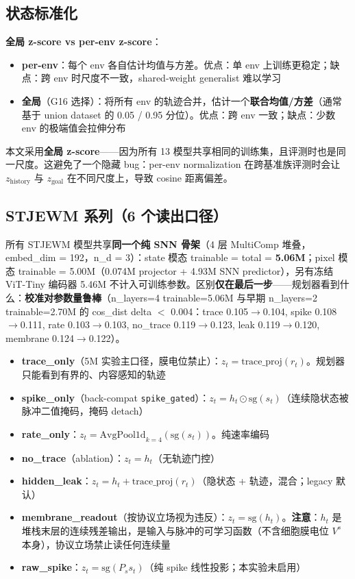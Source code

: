 \documentclass[11pt,a4paper]{article}
\begin{document}
\subsection{状态标准化}

\textbf{全局 z-score vs per-env z-score}：
\begin{itemize}[leftmargin=2em]
    \item \textbf{per-env}：每个 env 各自估计均值与方差。优点：单 env 上训练更稳定；缺点：跨 env 时尺度不一致，shared-weight generalist 难以学习
    \item \textbf{全局}（G16 选择）：将所有 env 的轨迹合并，估计一个\textbf{联合均值/方差}（通常基于 union dataset 的 0.05 / 0.95 分位）。优点：跨 env 一致；缺点：少数 env 的极端值会拉伸分布
\end{itemize}

本文采用\textbf{全局 z-score}——因为所有 13 模型共享相同的训练集，且评测时也是同一尺度。这避免了一个隐藏 bug：per-env normalization 在跨基准族评测时会让 $z_\text{history}$ 与 $z_\text{goal}$ 在不同尺度上，导致 cosine 距离偏差。

\subsection{STJEWM 系列（6 个读出口径）}
所有 STJEWM 模型共享\textbf{同一个纯 SNN 骨架}（4 层 MultiComp 堆叠，embed\_dim = 192，n\_d = 3）：state 模态 trainable = total = \textbf{5.06M}；pixel 模态 trainable = 5.00M（0.074M projector + 4.93M SNN predictor），另有冻结 ViT-Tiny 编码器 5.46M 不计入可训练参数。区别\textbf{仅在最后一步}——规划器看到什么：\textbf{校准对参数量鲁棒}（n\_layers=4 trainable=5.06M 与早期 n\_layers=2 trainable=2.70M 的 cos\_dist delta $<$ 0.004：trace 0.105$\to$0.104, spike 0.108$\to$0.111, rate 0.103$\to$0.103, no\_trace 0.119$\to$0.123, leak 0.119$\to$0.120, membrane 0.124$\to$0.122）。

\begin{itemize}[leftmargin=2em]
    \item \textbf{trace\_only}（5M 实验主口径，膜电位禁止）：$z_t = \text{trace\_proj}(r_t)$。规划器只能看到有界的、内容感知的轨迹
    \item \textbf{spike\_only}（back-compat \texttt{spike\_gated}）：$z_t = h_t \odot \text{sg}(s_t)$（连续隐状态被脉冲二值掩码，掩码 detach）
    \item \textbf{rate\_only}：$z_t = \text{AvgPool1d}_{k=4}(\text{sg}(s_t))$。纯速率编码
    \item \textbf{no\_trace}（ablation）：$z_t = h_t$（无轨迹门控）
    \item \textbf{hidden\_leak}：$z_t = h_t + \text{trace\_proj}(r_t)$（隐状态 + 轨迹，混合；legacy 默认）
    \item \textbf{membrane\_readout}（按协议立场视为违反）：$z_t = \text{sg}(h_t)$。\textbf{注意}：$h_t$ 是堆栈末层的连续残差输出，是输入与脉冲的可学习函数（不含细胞膜电位 $V^s$ 本身），协议立场禁止读任何连续量
    \item \textbf{raw\_spike}：$z_t = \text{sg}(P_s s_t)$（纯 spike 线性投影；本实验未启用）
\end{itemize}
\end{document}

